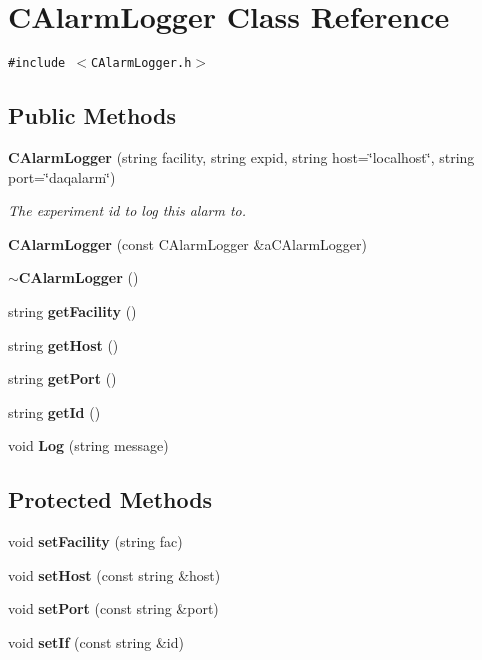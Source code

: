 \section{CAlarm\-Logger  Class Reference}
\label{classCAlarmLogger}
{\tt \#include $<$CAlarm\-Logger.h$>$}

\subsection*{Public Methods}
\begin{CompactItemize}
\item 
{\bf CAlarm\-Logger} (string facility, string expid, string host=\char`\"{}localhost\char`\"{}, string port=\char`\"{}daqalarm\char`\"{})
\begin{CompactList}\small\item\em The experiment id to log this alarm to.\item\end{CompactList}\item 
{\bf CAlarm\-Logger} (const CAlarm\-Logger \&a\-CAlarm\-Logger)
\item 
{\bf $\sim$CAlarm\-Logger} ()
\item 
string {\bf get\-Facility} ()
\item 
string {\bf get\-Host} ()
\item 
string {\bf get\-Port} ()
\item 
string {\bf get\-Id} ()
\item 
void {\bf Log} (string message)
\end{CompactItemize}
\subsection*{Protected Methods}
\begin{CompactItemize}
\item 
void {\bf set\-Facility} (string fac)
\item 
void {\bf set\-Host} (const string \&host)
\item 
void {\bf set\-Port} (const string \&port)
\item 
void {\bf set\-If} (const string \&id)
\end{CompactItemize}

